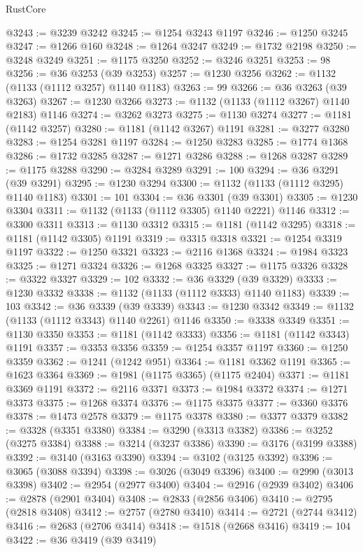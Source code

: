 \begin{lexlean}{RustCore}
\begin{coremodule}
@3243 := @3239 @3242
@3245 := @1254 @3243 @1197
@3246 := @1250 @3245
@3247 := @1266 @160
@3248 := @1264 @3247
@3249 := @1732 @2198
@3250 := @3248 @3249
@3251 := @1175 @3250
@3252 := @3246 @3251
@3253 := 98
@3256 := @36 @3253 (@39 @3253)
@3257 := @1230 @3256
@3262 := @1132 (@1133 (@1112 @3257) @1140 @1183)
@3263 := 99
@3266 := @36 @3263 (@39 @3263)
@3267 := @1230 @3266
@3273 := @1132 (@1133 (@1112 @3267) @1140 @2183) @1146
@3274 := @3262 @3273
@3275 := @1130 @3274
@3277 := @1181 (@1142 @3257)
@3280 := @1181 (@1142 @3267) @1191
@3281 := @3277 @3280
@3283 := @1254 @3281 @1197
@3284 := @1250 @3283
@3285 := @1774 @1368
@3286 := @1732 @3285
@3287 := @1271 @3286
@3288 := @1268 @3287
@3289 := @1175 @3288
@3290 := @3284 @3289
@3291 := 100
@3294 := @36 @3291 (@39 @3291)
@3295 := @1230 @3294
@3300 := @1132 (@1133 (@1112 @3295) @1140 @1183)
@3301 := 101
@3304 := @36 @3301 (@39 @3301)
@3305 := @1230 @3304
@3311 := @1132 (@1133 (@1112 @3305) @1140 @2221) @1146
@3312 := @3300 @3311
@3313 := @1130 @3312
@3315 := @1181 (@1142 @3295)
@3318 := @1181 (@1142 @3305) @1191
@3319 := @3315 @3318
@3321 := @1254 @3319 @1197
@3322 := @1250 @3321
@3323 := @2116 @1368
@3324 := @1984 @3323
@3325 := @1271 @3324
@3326 := @1268 @3325
@3327 := @1175 @3326
@3328 := @3322 @3327
@3329 := 102
@3332 := @36 @3329 (@39 @3329)
@3333 := @1230 @3332
@3338 := @1132 (@1133 (@1112 @3333) @1140 @1183)
@3339 := 103
@3342 := @36 @3339 (@39 @3339)
@3343 := @1230 @3342
@3349 := @1132 (@1133 (@1112 @3343) @1140 @2261) @1146
@3350 := @3338 @3349
@3351 := @1130 @3350
@3353 := @1181 (@1142 @3333)
@3356 := @1181 (@1142 @3343) @1191
@3357 := @3353 @3356
@3359 := @1254 @3357 @1197
@3360 := @1250 @3359
@3362 := @1241 (@1242 @951)
@3364 := @1181 @3362 @1191
@3365 := @1623 @3364
@3369 := @1981 (@1175 @3365) (@1175 @2404)
@3371 := @1181 @3369 @1191
@3372 := @2116 @3371
@3373 := @1984 @3372
@3374 := @1271 @3373
@3375 := @1268 @3374
@3376 := @1175 @3375
@3377 := @3360 @3376
@3378 := @1473 @2578
@3379 := @1175 @3378
@3380 := @3377 @3379
@3382 := @3328 (@3351 @3380)
@3384 := @3290 (@3313 @3382)
@3386 := @3252 (@3275 @3384)
@3388 := @3214 (@3237 @3386)
@3390 := @3176 (@3199 @3388)
@3392 := @3140 (@3163 @3390)
@3394 := @3102 (@3125 @3392)
@3396 := @3065 (@3088 @3394)
@3398 := @3026 (@3049 @3396)
@3400 := @2990 (@3013 @3398)
@3402 := @2954 (@2977 @3400)
@3404 := @2916 (@2939 @3402)
@3406 := @2878 (@2901 @3404)
@3408 := @2833 (@2856 @3406)
@3410 := @2795 (@2818 @3408)
@3412 := @2757 (@2780 @3410)
@3414 := @2721 (@2744 @3412)
@3416 := @2683 (@2706 @3414)
@3418 := @1518 (@2668 @3416)
@3419 := 104
@3422 := @36 @3419 (@39 @3419)

\end{coremodule}
\end{lexlean}
